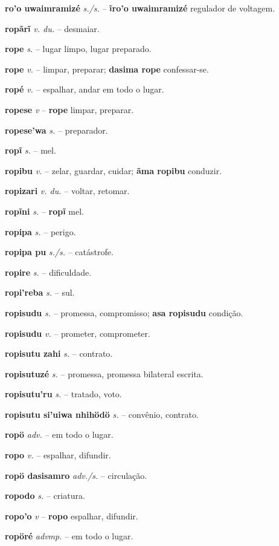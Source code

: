 \textbf{ro'o uwaimramizé} \textit{s./s.} -- \textbf{ĩro'o uwaimramizé} regulador de voltagem.

\textbf{ropãrĩ} \textit{v. du.} -- desmaiar.

\textbf{rope} \textit{s.} -- lugar limpo, lugar preparado.

\textbf{rope} \textit{v.} -- limpar, preparar; \textbf{dasima rope} confessar-se.

\textbf{ropé} \textit{v.} -- espalhar, andar em todo o lugar.

\textbf{ropese} \textit{v} -- \textbf{rope} limpar, preparar.

\textbf{ropese'wa} \textit{s.} -- preparador.

\textbf{ropĩ} \textit{s.} -- mel.

\textbf{ropibu} \textit{v.} -- zelar, guardar, cuidar; \textbf{ãma ropibu} conduzir.

\textbf{ropizari} \textit{v. du.} -- voltar, retomar.

\textbf{ropĩni} \textit{s.} -- \textbf{ropĩ} mel.

\textbf{ropipa} \textit{s.} -- perigo.

\textbf{ropipa pu} \textit{s./s.} -- catástrofe.

\textbf{ropire} \textit{s.} -- dificuldade.

\textbf{ropi'reba} \textit{s.} -- sul.

\textbf{ropisudu} \textit{s.} -- promessa, compromisso; \textbf{asa ropisudu} condição.

\textbf{ropisudu} \textit{v.} -- prometer, comprometer.

\textbf{ropisutu zahi} \textit{s.} -- contrato.

\textbf{ropisutuzé} \textit{s.} -- promessa, promessa bilateral escrita.

\textbf{ropisutu'ru} \textit{s.} -- tratado, voto.

\textbf{ropisutu si'uiwa nhihödö} \textit{s.} -- convênio, contrato.

\textbf{ropö} \textit{adv.} -- em todo o lugar.

\textbf{ropo} \textit{v.} -- espalhar, difundir.

\textbf{ropö dasisamro} \textit{adv./s.} -- circulação.

\textbf{ropodo} \textit{s.} -- criatura.

\textbf{ropo'o} \textit{v} -- \textbf{ropo} espalhar, difundir.

\textbf{ropöré} \textit{advmp.} -- em todo o lugar.

